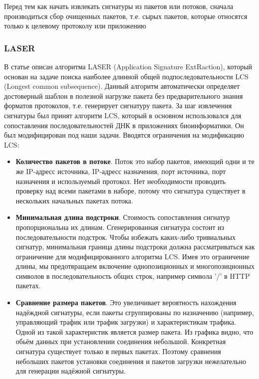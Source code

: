 Перед тем как начать извлекать сигнатуры из пакетов или потоков, сначала производиться сбор очищенных пакетов,
т.е. сырых  пакетов, которые относятся только к целевому протоколу или приложению

\subsubsection{LASER}

В статье \cite{park2008towards} описан алгоритма LASER (Application Signature ExtRaction),
который основан на задаче поиска наиболее длинной общей подпоследовательности LCS (Longest common subsequence).
Данный алгоритм автоматически определяет достоверный шаблон в полезной нагрузке пакета без предварительного знания форматов протоколов, т.е. генерирует сигнатуру пакета.
За шаг извлечения сигнатуры был принят алгоритм LCS, который в основном использовался для сопоставления последовательностей ДНК в приложениях биоинформатики.
Он был модифицирован под наши задачи.
Вводятся ограничения на модификацию LCS:

\begin{itemize}
    \item \textbf{Количество пакетов в потоке}. Поток это набор пакетов, имеющий одни и те же IP-адресс источника,
    IP-адресс назначения, порт источника, порт назначения и используемый протокол.
    Нет необходимости проводить проверку над всеми пакетами в наборе,
    потому что сигнатура существует в нескольких начальных пакетах потока.
    \item \textbf{Минимальная длина подстроки}. Стоимость сопоставления сигнатур пропорциональна их длинам.
    Сгенерированная сигнатура состоит из последовательности подстрок.
    Чтобы избежать каких-либо тривиальных сигнатур,
    минимальная граница длины подстроки должна рассматриваться как ограничение для модифицированного алгоритма LCS.
    Имея это ограничение длины, мы предотвращаем включение однопозиционных и многопозиционных символов в последовательность общих строк,
    например символа '/' в HTTP пакетах.
    \item \textbf{Сравнение размера пакетов}. Это увеличивает вероятность нахождения надёждной сигнатуры,
    если пакеты сгруппированы по назначению (например, управляющий трафик или трафик загрузки) и характеристикам трафика.
    Одной из такой характеристик является размер пакета.
    Из графика видно, что обьём данных при установлении соединения небольшой. Конкретная сигнатура существует только в первых пакетах.
    Поэтому сравнения небольших пакетов установки соединения и пакетов загрузки нежелательно для генерации надёжной сигнатуры.

\end{itemize}


